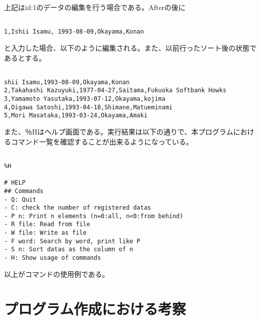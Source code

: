 \documentclass[a4j]{jarticle}
\begin{document}
上記はid:1のデータの編集を行う場合である。Afterの後に

{\baselineskip 3mm
\begin{verbatim}

1,Ishii Isamu, 1993-08-09,Okayama,Konan

\end{verbatim}
}

と入力した場合、以下のように編集される。また、以前行ったソート後の状態であるとする。

{\baselineskip 3mm
\begin{verbatim}

shii Isamu,1993-08-09,Okayama,Konan
2,Takahashi Kazuyuki,1977-04-27,Saitama,Fukuoka Softbank Howks
3,Yamamoto Yasutaka,1993-07-12,Okayama,kojima
4,Oigawa Satoshi,1993-04-18,Shimane,Matueminami
5,Mori Masataka,1993-03-24,Okayama,Amaki

\end{verbatim}
}

また、％Hはヘルプ画面である。実行結果は以下の通りで、本プログラムにおけるコマンド一覧を確認することが出来るようになっている。

{\baselineskip 3mm
\begin{verbatim}

%H

# HELP
## Commands
- Q: Quit
- C: check the number of registered datas
- P n: Print n elements (n=0:all, n<0:from behind)
- R file: Read from file
- W file: Write as file
- F word: Search by word, print like P
- S n: Sort datas as the column of n
- H: Show usage of commands

\end{verbatim}
}

以上がコマンドの使用例である。


%
%

\section{プログラム作成における考察}
\end{document}
